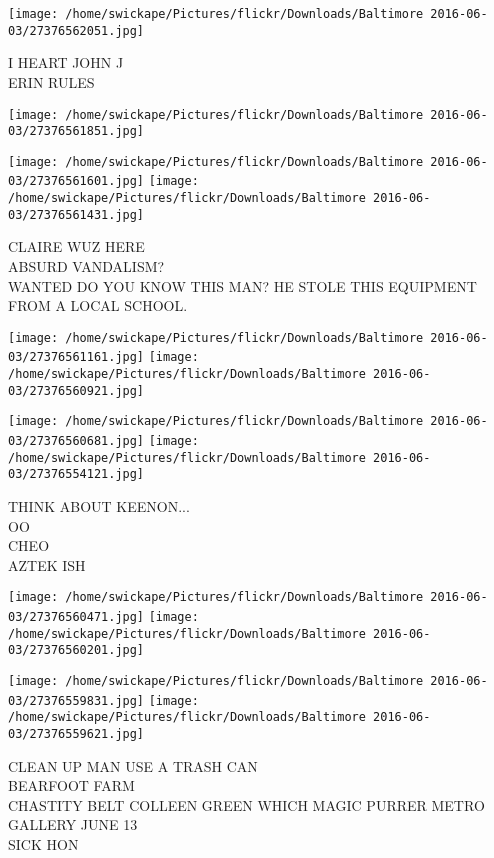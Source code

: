 \documentclass[10pt,letterpaper]{article}
\begin{document}
\vspace{0.25in}
\texttt{[image: /home/swickape/Pictures/flickr/Downloads/Baltimore 2016-06-03/27376562051.jpg]}

I HEART JOHN J\\
ERIN RULES
\pagebreak

\texttt{[image: /home/swickape/Pictures/flickr/Downloads/Baltimore 2016-06-03/27376561851.jpg]}

\vspace{0.25in}
\texttt{[image: /home/swickape/Pictures/flickr/Downloads/Baltimore 2016-06-03/27376561601.jpg]}
\texttt{[image: /home/swickape/Pictures/flickr/Downloads/Baltimore 2016-06-03/27376561431.jpg]}

CLAIRE WUZ HERE\\
ABSURD VANDALISM?\\
WANTED DO YOU KNOW THIS MAN?  HE STOLE THIS EQUIPMENT FROM A LOCAL SCHOOL.
\pagebreak

\texttt{[image: /home/swickape/Pictures/flickr/Downloads/Baltimore 2016-06-03/27376561161.jpg]}
\texttt{[image: /home/swickape/Pictures/flickr/Downloads/Baltimore 2016-06-03/27376560921.jpg]}

\texttt{[image: /home/swickape/Pictures/flickr/Downloads/Baltimore 2016-06-03/27376560681.jpg]}
\texttt{[image: /home/swickape/Pictures/flickr/Downloads/Baltimore 2016-06-03/27376554121.jpg]}

THINK ABOUT KEENON...\\
OO\\
CHEO\\
AZTEK ISH
\pagebreak

\texttt{[image: /home/swickape/Pictures/flickr/Downloads/Baltimore 2016-06-03/27376560471.jpg]}
\texttt{[image: /home/swickape/Pictures/flickr/Downloads/Baltimore 2016-06-03/27376560201.jpg]}

\texttt{[image: /home/swickape/Pictures/flickr/Downloads/Baltimore 2016-06-03/27376559831.jpg]}
\texttt{[image: /home/swickape/Pictures/flickr/Downloads/Baltimore 2016-06-03/27376559621.jpg]}

CLEAN UP MAN USE A TRASH CAN\\
BEARFOOT FARM\\
CHASTITY BELT COLLEEN GREEN WHICH MAGIC PURRER METRO GALLERY JUNE 13\\
SICK HON
\pagebreak
\end{document}
